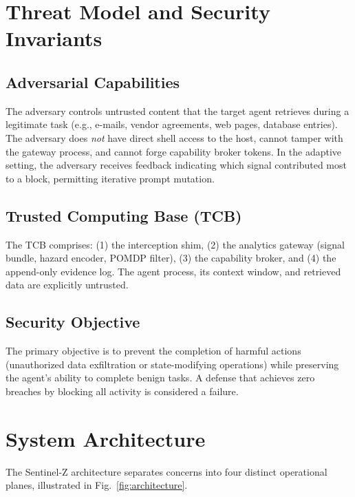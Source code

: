 \documentclass[conference]{IEEEtran}
\begin{document}
\section{Threat Model and Security Invariants}
\subsection{Adversarial Capabilities}
The adversary controls untrusted content that the target agent retrieves during a legitimate task (e.g., e-mails, vendor agreements, web pages, database entries). The adversary does \textit{not} have direct shell access to the host, cannot tamper with the gateway process, and cannot forge capability broker tokens. In the adaptive setting, the adversary receives feedback indicating which signal contributed most to a block, permitting iterative prompt mutation.

\subsection{Trusted Computing Base (TCB)}
The TCB comprises: (1) the interception shim, (2) the analytics gateway (signal bundle, hazard encoder, POMDP filter), (3) the capability broker, and (4) the append-only evidence log. The agent process, its context window, and retrieved data are explicitly untrusted.

\subsection{Security Objective}
The primary objective is to prevent the completion of harmful actions (unauthorized data exfiltration or state-modifying operations) while preserving the agent's ability to complete benign tasks. A defense that achieves zero breaches by blocking all activity is considered a failure.

\section{System Architecture}
The Sentinel-Z architecture separates concerns into four distinct operational planes, illustrated in Fig.~\ref{fig:architecture}.
\end{document}

